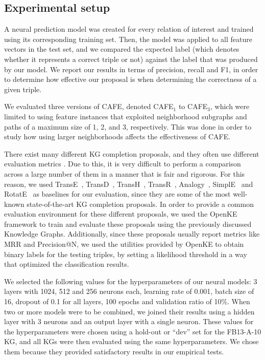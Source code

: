

\subsection{Experimental setup}
A neural prediction model was created for every relation of interest and trained using its corresponding training set. Then, the model was applied to all feature vectors in the test set, and we compared the expected label (which denotes whether it represents a correct triple or not) against the label that was produced by our model. We report our results in terms of precision, recall and F1, in order to determine how effective our proposal is when determining the correctness of a given triple.

We evaluated three versions of CAFE, denoted CAFE$_1$ to CAFE$_3$, which were limited to using feature instances that exploited neighborhood subgraphs and paths of a maximum size of 1, 2, and 3, respectively. This was done in order to study how using larger neighborhoods affects the effectiveness of CAFE.

There exist many different KG completion proposals, and they often use different evaluation metrics \cite{speranskaya2020}. Due to this, it is very difficult to perform a comparison across a large number of them in a manner that is fair and rigorous. For this reason, we used TransE~\cite{bordes2013}, TransD~\cite{ji2015}, TransH~\cite{wang2014}, TransR~\cite{lin2015}, Analogy~\cite{liu2017}, SimplE~\cite{kazemi2018} and RotatE~\cite{sun2019} as baselines for our evaluation, since they are some of the most well-known state-of-the-art KG completion proposals. In order to provide a common evaluation environment for these different proposals, we used the OpenKE \cite{han2018} framework to train and evaluate these proposals using the previously discussed Knowledge Graphs. Additionally, since these proposals usually report metrics like MRR and Precision@N, we used the utilities provided by OpenKE to obtain binary labels for the testing triples, by setting a likelihood threshold in a way that optimized the classification results.

We selected the following values for the hyperparameters of our neural models: 3 layers with 1024, 512 and 256 neurons each, learning rate of 0.001, batch size of 16, dropout of 0.1 for all layers, 100 epochs and validation ratio of 10\%. When two or more models were to be combined, we joined their results using a hidden layer with 3 neurons and an output layer with a single neuron. These values for the hyperparameters were chosen using a hold-out or ``dev'' set for the FB13-A-10 KG, and all KGs were then evaluated using the same hyperparameters. We chose them because they provided satisfactory results in our empirical tests.

